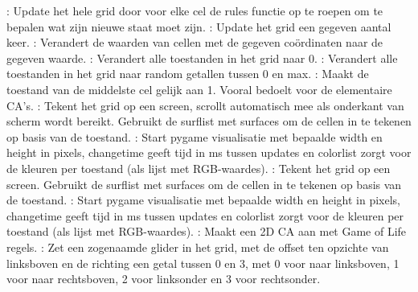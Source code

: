 {}: Update het hele grid door voor elke cel de rules functie op te roepen om te bepalen wat zijn nieuwe staat moet zijn.\markdownRendererInterblockSeparator
{}: Update het grid een gegeven aantal keer.\markdownRendererInterblockSeparator
{}: Verandert de waarden van cellen met de gegeven coördinaten naar de gegeven waarde.\markdownRendererInterblockSeparator
{}: Verandert alle toestanden in het grid naar 0.\markdownRendererInterblockSeparator
{}: Verandert alle toestanden in het grid naar random getallen tussen 0 en max.\markdownRendererInterblockSeparator
{}: Maakt de toestand van de middelste cel gelijk aan 1. Vooral bedoelt voor de elementaire CA's.\markdownRendererInterblockSeparator
{}: Tekent het grid op een screen, scrollt automatisch mee als onderkant van scherm wordt bereikt. Gebruikt de surflist met surfaces om de cellen in te tekenen op basis van de toestand.\markdownRendererInterblockSeparator
{}: Start pygame visualisatie met bepaalde width en height in pixels, changetime geeft tijd in ms tussen updates en colorlist zorgt voor de kleuren per toestand (als lijst met RGB-waardes).\markdownRendererInterblockSeparator
{}: Tekent het grid op een screen. Gebruikt de surflist met surfaces om de cellen in te tekenen op basis van de toestand.\markdownRendererInterblockSeparator
{}: Start pygame visualisatie met bepaalde width en height in pixels, changetime geeft tijd in ms tussen updates en colorlist zorgt voor de kleuren per toestand (als lijst met RGB-waardes).\markdownRendererInterblockSeparator
{}: Maakt een 2D CA aan met Game of Life regels.\markdownRendererInterblockSeparator
{}: Zet een zogenaamde glider in het grid, met de offset ten opzichte van linksboven en de richting een getal tussen 0 en 3, met 0 voor naar linksboven, 1 voor naar rechtsboven, 2 voor linksonder en 3 voor rechtsonder.\markdownRendererInterblockSeparator

